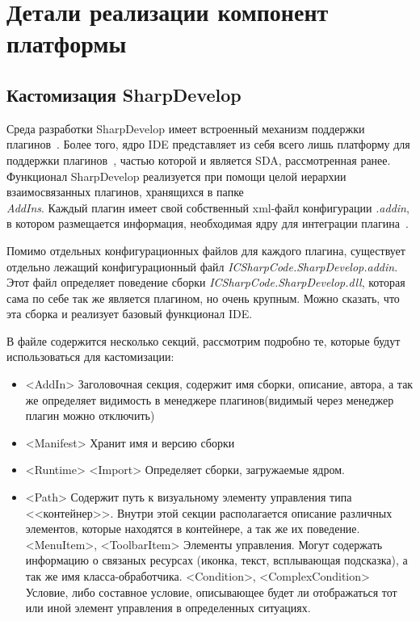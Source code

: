 \section{Детали реализации компонент платформы}
\label{sec:dev-details}

\subsection{Кастомизация SharpDevelop}
\label{sec:sd_custom}

Среда разработки SharpDevelop имеет встроенный механизм поддержки плагинов~\cite{sharpdevelop}. Более того, ядро IDE представляет из себя всего лишь платформу для поддержки плагинов~\cite{use-sd-core}, частью которой и является SDA, рассмотренная ранее. Функционал SharpDevelop реализуется при помощи целой иерархии взаимосвязанных плагинов, хранящихся в папке {\it \\AddIns}. Каждый плагин имеет свой собственный xml-файл конфигурации {\it *.addin}, в котором размещается информация, необходимая ядру для интеграции плагина~\cite{writing-sd-addin}. 

Помимо отдельных конфигурационных файлов для каждого плагина, существует отдельно лежащий конфигурационный файл {\it ICSharpCode.SharpDevelop.addin}. Этот файл определяет поведение сборки {\it ICSharpCode.SharpDevelop.dll}, которая сама по себе так же является плагином, но очень крупным. Можно сказать, что эта сборка и реализует базовый функционал IDE.

В файле содержится несколько секций, рассмотрим подробно те, которые будут использоваться для кастомизации: 

\begin{itemize}
 \item <AddIn> Заголовочная секция, содержит имя сборки, описание, автора, а так же определяет видимость в менеджере плагинов(видимый через менеджер плагин можно отключить)
 \item <Manifest> Хранит имя и версию сборки
 \item <Runtime> <Import> Определяет сборки, загружаемые ядром.
 \item <Path> Содержит путь к визуальному элементу управления типа <<контейнер>>. Внутри этой секции располагается описание различных элементов, которые находятся в контейнере, а так же их поведение.
   \subitem <MenuItem>, <ToolbarItem> Элементы управления. Могут содержать информацию о связаных ресурсах (иконка, текст, всплывающая подсказка), а так же имя класса-обработчика.
   \subitem <Condition>, <ComplexCondition> Условие, либо составное условие, описывающее будет ли отображаться тот или иной элемент управления в определенных ситуациях.
\end{itemize}

